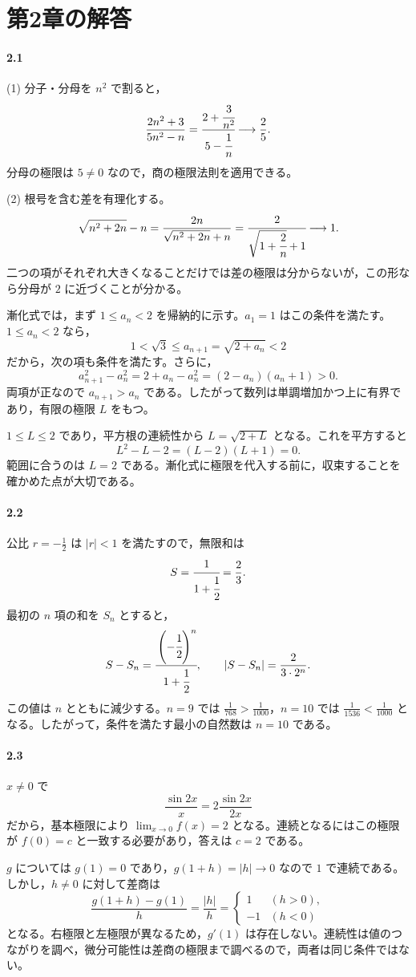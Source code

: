 \section{第2章の解答}\label{解答:第2章}
\paragraph{2.1}
(1) 分子・分母を $n^2$ で割ると，
\[
 \frac{2n^2+3}{5n^2-n}
 =\cfrac{2+\cfrac3{n^2}}{5-\cfrac1n}
 \longrightarrow\frac25.
\]
分母の極限は $5\ne0$ なので，商の極限法則を適用できる。

(2) 根号を含む差を有理化する。
\[
 \sqrt{n^2+2n}-n
 =\frac{2n}{\sqrt{n^2+2n}+n}
 =\cfrac2{\sqrt{1+\cfrac2n}+1}
 \longrightarrow1.
\]
二つの項がそれぞれ大きくなることだけでは差の極限は分からないが，この形なら分母が $2$ に近づくことが分かる。

漸化式では，まず $1\le a_n<2$ を帰納的に示す。$a_1=1$ はこの条件を満たす。$1\le a_n<2$ なら，
\[
 1<\sqrt3\le a_{n+1}=\sqrt{2+a_n}<2
\]
だから，次の項も条件を満たす。さらに，
\[
 a_{n+1}^2-a_n^2
 =2+a_n-a_n^2=(2-a_n)(a_n+1)>0.
\]
両項が正なので $a_{n+1}>a_n$ である。したがって数列は単調増加かつ上に有界であり，有限の極限 $L$ をもつ。

$1\le L\le2$ であり，平方根の連続性から $L=\sqrt{2+L}$ となる。これを平方すると
\[
 L^2-L-2=(L-2)(L+1)=0.
\]
範囲に合うのは $L=2$ である。漸化式に極限を代入する前に，収束することを確かめた点が大切である。

\paragraph{2.2}
公比 $r=-\frac12$ は $|r|<1$ を満たすので，無限和は
\[
 S=\cfrac1{1+\cfrac12}=\frac23.
\]
最初の $n$ 項の和を $S_n$ とすると，
\[
 S-S_n=\cfrac{\left(-\cfrac12\right)^n}{1+\cfrac12},\qquad
 |S-S_n|=\frac{2}{3\cdot2^n}.
\]
この値は $n$ とともに減少する。$n=9$ では $\frac1{768}>\frac1{1000}$，$n=10$ では $\frac1{1536}<\frac1{1000}$ となる。したがって，条件を満たす最小の自然数は $n=10$ である。

\paragraph{2.3}
$x\ne0$ で
\[
 \frac{\sin2x}{x}=2\frac{\sin2x}{2x}
\]
だから，基本極限により $\lim_{x\to0}f(x)=2$ となる。連続となるにはこの極限が $f(0)=c$ と一致する必要があり，答えは $c=2$ である。

$g$ については $g(1)=0$ であり，$g(1+h)=|h|\to0$ なので $1$ で連続である。しかし，$h\ne0$ に対して差商は
\[
 \frac{g(1+h)-g(1)}h=\frac{|h|}{h}
 =\begin{cases}1&(h>0),\\-1&(h<0)\end{cases}
\]
となる。右極限と左極限が異なるため，$g'(1)$ は存在しない。連続性は値のつながりを調べ，微分可能性は差商の極限まで調べるので，両者は同じ条件ではない。

